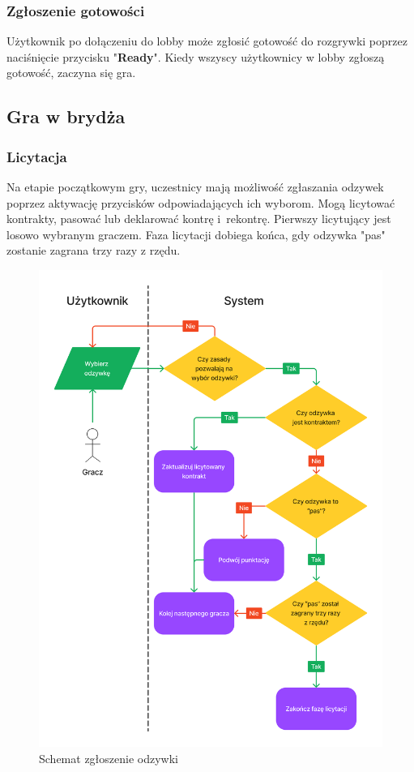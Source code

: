 \FloatBarrier

\subsubsection{Zgłoszenie gotowości}
Użytkownik po dołączeniu do lobby może zgłosić gotowość do rozgrywki poprzez
naciśnięcie przycisku "\textbf{Ready}". Kiedy wszyscy użytkownicy w lobby zgłoszą
gotowość, zaczyna się gra.

\subsection{Gra w brydża}

\subsubsection{Licytacja}
Na etapie początkowym gry, uczestnicy mają możliwość zgłaszania odzywek poprzez
aktywację przycisków odpowiadających ich wyborom. Mogą licytować kontrakty, pasować lub
deklarować kontrę i~rekontrę. Pierwszy licytujący jest losowo
wybranym graczem. Faza licytacji dobiega końca, gdy odzywka "pas" zostanie zagrana
trzy razy z rzędu.

\begin{figure}[h]
  \centering
  \includegraphics[width=\textwidth]{img/schematy/bid.png}
  \caption{Schemat zgłoszenie odzywki}
\end{figure}

